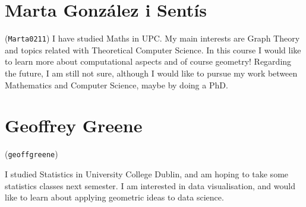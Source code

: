 \documentclass[11pt]{amsart}
\begin{document}
\section*{Marta González i Sentís}
(\texttt{Marta0211})
I have studied Maths in UPC. My main interests are Graph Theory and topics related with Theoretical Computer Science. In this course I would like to learn more about computational aspects and of course geometry! Regarding the future, I am still not sure, although I would like to pursue my work between Mathematics and Computer Science, maybe by doing a PhD.

\medskip

\section*{Geoffrey Greene}
(\texttt{geoffgreene})

I studied Statistics in University College Dublin, and am hoping to take some statistics classes next semester. I am interested in data visualisation, and would like to learn about applying geometric ideas to data science. 
\end{document}
